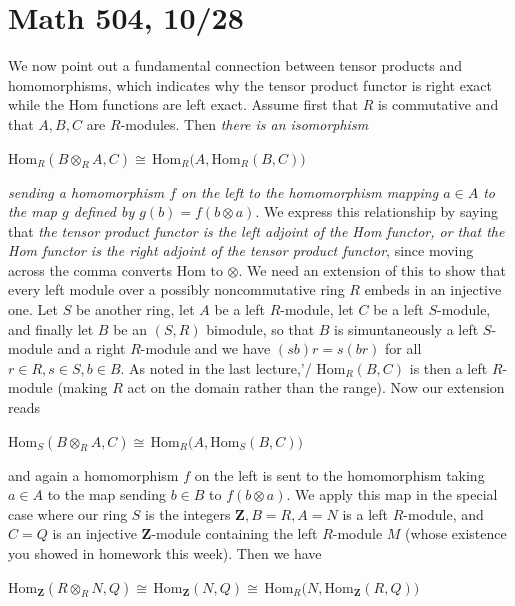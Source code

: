 \documentclass[10pt]{article}
\begin{document}
\section*{Math 504, 10/28}

We now point out a fundamental connection between tensor products and
homomorphisms, which indicates why the tensor product functor is right
exact while the Hom functions are left exact. Assume first that $R$ is
commutative and that $A,B,C$ are $R$-modules. Then {\sl there is an
  isomorphism}

Hom$_R(B\otimes_R A,C)\cong\,$Hom$_R(A,$Hom$_R(B,C))$

{\sl sending a homomorphism $f$ on the left to the homomorphism mapping
  $a\in A$ to the map $g$ defined by $g(b) = f(b\otimes a)$}. We express
this relationship by saying that {\sl the tensor product functor is the
  left adjoint of the Hom functor, or that the Hom functor is the right
  adjoint of the tensor product functor}, since moving across the comma
converts Hom to $\otimes$. We need an extension of this to show that
every left module over a possibly noncommutative ring $R$ embeds in an
injective one. Let $S$ be another ring, let $A$ be a left $R$-module,
let $C$ be a left $S$-module, and finally let $B$ be an $(S,R)$
bimodule, so that $B$ is simuntaneously a left $S$-module and a right
$R$-module and we have $(sb)r = s(br)$ for all $r\in R,s\in S,b\in B$.
As noted in the last lecture,'/ Hom$_R(B,C)$ is then a left $R$-module
(making $R$ act on the domain rather than the range). Now our extension
reads

Hom$_S(B\otimes_R A,C)\cong\,$Hom$_R(A,$Hom$_S(B,C))$

and again a homomorphism $f$ on the left is sent to the homomorphism
taking $a\in A$ to the map sending $b\in B$ to $f(b\otimes a)$. We apply
this map in the special case where our ring $S$ is the integers $\mathbf
Z, B=R, A=N$ is a left $R$-module, and $C=Q$ is an injective $\mathbf
Z$-module containing the left $R$-module $M$ (whose existence you showed
in homework this week). Then we have

Hom$_{\mathbf Z}(R\otimes_R N,Q) \cong\,$Hom$_{\mathbf
  Z}(N,Q)\cong\,$Hom$_R(N,$Hom$_{\mathbf Z} (R,Q))$
\end{document}
